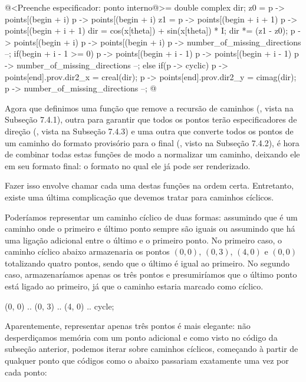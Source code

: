 \iniciocodigo
@<Preenche especificador: ponto interno@>=
{
  double complex dir;
  z0 = p -> points[(begin + i) %
       p -> points[(begin + i) %
  z1 = p -> points[(begin + i + 1) %
       p -> points[(begin + i + 1) %
  dir = cos(x[theta]) + sin(x[theta]) * I;
  dir *= (z1 - z0);
  p -> points[(begin + i) %
  p -> points[(begin + i) %
  p -> number_of_missing_directions --;
  if(begin + i - 1 >= 0){
    p -> points[(begin + i - 1) %
    p -> points[(begin + i - 1) %
    p -> number_of_missing_directions --;
  }
  else if(p -> cyclic){
    p -> points[end].prov.dir2_x = creal(dir);
    p -> points[end].prov.dir2_y = cimag(dir);
    p -> number_of_missing_directions --;
  }
}
@
\fimcodigo


Agora que definimos uma função que remove a recursão de caminhos
(, vista na Subseção 7.4.1), outra
para garantir que todos os pontos terão especificadores de direção
(, vista na Subseção 7.4.3) e
uma outra que converte todos os pontos de um caminho do formato
provisório para o final (, visto na
Subseção 7.4.2), é hora de combinar todas estas funções de modo a
normalizar um caminho, deixando ele em seu formato final: o formato no
qual ele já pode ser renderizado.

Fazer isso envolve chamar cada uma destas funções na ordem
certa. Entretanto, existe uma última complicação que devemos tratar
para caminhos cíclicos.

Poderíamos representar um caminho cíclico de duas formas: assumindo
que é um caminho onde o primeiro e último ponto sempre são iguais ou
assumindo que há uma ligação adicional entre o último e o primeiro
ponto. No primeiro caso, o caminho cíclico abaixo armazenaria os
pontos $(0, 0)$, $(0, 3)$, $(4, 0)$ e $(0, 0)$ totalizando quatro
pontos, sendo que o último é igual ao primeiro. No segundo caso,
armazenaríamos apenas os três pontos e presumiríamos que o último
ponto está ligado ao primeiro, já que o caminho estaria marcado como
cíclico.

\alinhaverbatim
(0, 0) .. (0, 3) .. (4, 0) .. cycle;
\alinhanormal

Aparentemente, representar apenas três pontos é mais elegante: não
desperdiçamos memória com um ponto adicional e como visto no código da
subseção anterior, podemos iterar sobre caminhos cíclicos, começando à
partir de qualquer ponto que códigos como o abaixo passariam
exatamente uma vez por cada ponto:

